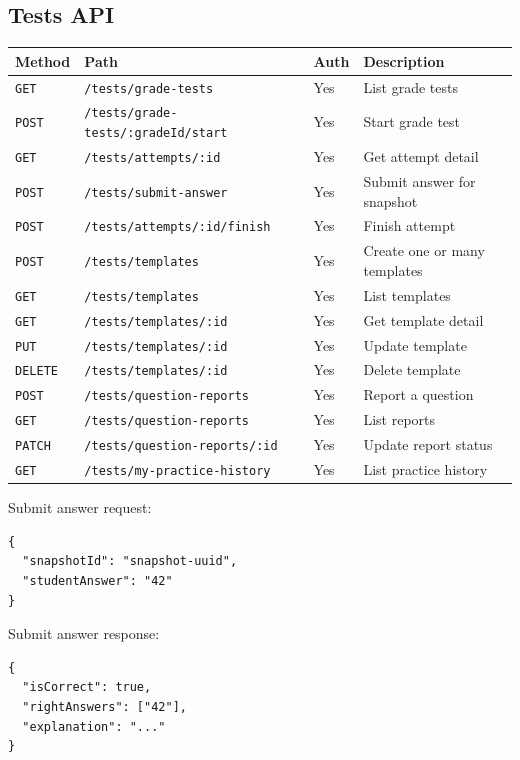 \documentclass[11pt,a4paper]{article}
\newcommand{\docpath}[1]{\texttt{#1}}
\begin{document}
\subsection{Tests API}

\begin{longtable}{L{0.12\textwidth}L{0.33\textwidth}L{0.12\textwidth}L{0.33\textwidth}}
\toprule
\textbf{Method} & \textbf{Path} & \textbf{Auth} & \textbf{Description} \\
\midrule
\endhead
\docpath{GET} & \docpath{/tests/grade-tests} & Yes & List grade tests \\
\docpath{POST} & \docpath{/tests/grade-tests/:gradeId/start} & Yes & Start grade test \\
\docpath{GET} & \docpath{/tests/attempts/:id} & Yes & Get attempt detail \\
\docpath{POST} & \docpath{/tests/submit-answer} & Yes & Submit answer for snapshot \\
\docpath{POST} & \docpath{/tests/attempts/:id/finish} & Yes & Finish attempt \\
\docpath{POST} & \docpath{/tests/templates} & Yes & Create one or many templates \\
\docpath{GET} & \docpath{/tests/templates} & Yes & List templates \\
\docpath{GET} & \docpath{/tests/templates/:id} & Yes & Get template detail \\
\docpath{PUT} & \docpath{/tests/templates/:id} & Yes & Update template \\
\docpath{DELETE} & \docpath{/tests/templates/:id} & Yes & Delete template \\
\docpath{POST} & \docpath{/tests/question-reports} & Yes & Report a question \\
\docpath{GET} & \docpath{/tests/question-reports} & Yes & List reports \\
\docpath{PATCH} & \docpath{/tests/question-reports/:id} & Yes & Update report status \\
\docpath{GET} & \docpath{/tests/my-practice-history} & Yes & List practice history \\
\bottomrule
\end{longtable}

Submit answer request:
\begin{lstlisting}[style=doccode]
{
  "snapshotId": "snapshot-uuid",
  "studentAnswer": "42"
}
\end{lstlisting}

Submit answer response:
\begin{lstlisting}[style=doccode]
{
  "isCorrect": true,
  "rightAnswers": ["42"],
  "explanation": "..."
}
\end{lstlisting}
\end{document}
